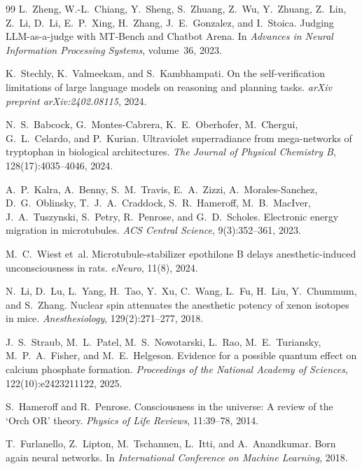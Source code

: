 \documentclass[11pt,a4paper]{article}
\begin{document}
\begin{thebibliography}{99}
L.~Zheng, W.-L.~Chiang, Y.~Sheng, S.~Zhuang, Z.~Wu, Y.~Zhuang, Z.~Lin, Z.~Li, D.~Li, E.~P.~Xing, H.~Zhang, J.~E.~Gonzalez, and I.~Stoica.
\newblock Judging {LLM}-as-a-judge with {MT-Bench} and {Chatbot Arena}.
\newblock In \emph{Advances in Neural Information Processing Systems}, volume~36, 2023.

K.~Stechly, K.~Valmeekam, and S.~Kambhampati.
\newblock On the self-verification limitations of large language models on reasoning and planning tasks.
\newblock \emph{arXiv preprint arXiv:2402.08115}, 2024.

N.~S.~Babcock, G.~Montes-Cabrera, K.~E.~Oberhofer, M.~Chergui, G.~L.~Celardo, and P.~Kurian.
\newblock Ultraviolet superradiance from mega-networks of tryptophan in biological architectures.
\newblock \emph{The Journal of Physical Chemistry B}, 128(17):4035--4046, 2024.

A.~P.~Kalra, A.~Benny, S.~M.~Travis, E.~A.~Zizzi, A.~Morales-Sanchez, D.~G.~Oblinsky, T.~J.~A.~Craddock, S.~R.~Hameroff, M.~B.~MacIver, J.~A.~Tuszynski, S.~Petry, R.~Penrose, and G.~D.~Scholes.
\newblock Electronic energy migration in microtubules.
\newblock \emph{ACS Central Science}, 9(3):352--361, 2023.

M.~C.~Wiest et~al.
\newblock Microtubule-stabilizer epothilone {B} delays anesthetic-induced unconsciousness in rats.
\newblock \emph{eNeuro}, 11(8), 2024.

N.~Li, D.~Lu, L.~Yang, H.~Tao, Y.~Xu, C.~Wang, L.~Fu, H.~Liu, Y.~Chummum, and S.~Zhang.
\newblock Nuclear spin attenuates the anesthetic potency of xenon isotopes in mice.
\newblock \emph{Anesthesiology}, 129(2):271--277, 2018.

J.~S.~Straub, M.~L.~Patel, M.~S.~Nowotarski, L.~Rao, M.~E.~Turiansky, M.~P.~A.~Fisher, and M.~E.~Helgeson.
\newblock Evidence for a possible quantum effect on calcium phosphate formation.
\newblock \emph{Proceedings of the National Academy of Sciences}, 122(10):e2423211122, 2025.

S.~Hameroff and R.~Penrose.
\newblock Consciousness in the universe: A review of the `{O}rch {OR}' theory.
\newblock \emph{Physics of Life Reviews}, 11:39--78, 2014.

T.~Furlanello, Z.~Lipton, M.~Tschannen, L.~Itti, and A.~Anandkumar.
\newblock Born again neural networks.
\newblock In \emph{International Conference on Machine Learning}, 2018.


\end{thebibliography}
\end{document}
